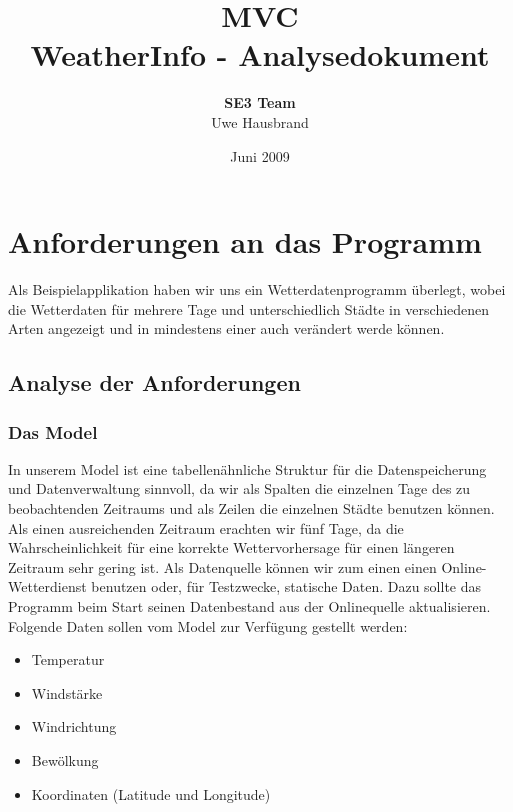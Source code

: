 \documentclass[11pt,a4paper]{scrreprt}
\begin{document}
\selectlanguage{\german}
\title{{\Huge \bf MVC}\\[0.55em]{\LARGE WeatherInfo - Analysedokument}}
\author{{\bf SE3 Team}\\Uwe Hausbrand}
\date{Juni 2009}

\maketitle

\tableofcontents

\chapter{Anforderungen an das Programm}

Als Beispielapplikation haben wir uns ein Wetterdatenprogramm \"uberlegt, wobei die
Wetterdaten f\"ur mehrere Tage und unterschiedlich St\"adte in verschiedenen Arten
angezeigt und in mindestens einer auch ver\"andert werde k\"onnen.

\section{Analyse der Anforderungen}

\subsection{Das Model}
In unserem Model ist eine tabellen\"ahnliche Struktur f\"ur die Datenspeicherung und
Datenverwaltung sinnvoll, da wir als Spalten die einzelnen Tage des zu beobachtenden
Zeitraums und als Zeilen die einzelnen St\"adte benutzen k\"onnen. Als einen ausreichenden
Zeitraum erachten wir f\"unf Tage, da die Wahrscheinlichkeit f\"ur eine
korrekte Wettervorhersage f\"ur einen l\"angeren Zeitraum sehr gering ist.
Als Datenquelle k\"onnen wir zum einen einen Online-Wetterdienst benutzen oder, f\"ur Testzwecke,
statische Daten. Dazu sollte das Programm beim Start seinen Datenbestand aus der Onlinequelle
aktualisieren.\\[11pt]
Folgende Daten sollen vom Model zur Verf\"ugung gestellt werden:
\begin{itemize}
  \item Temperatur
  \item Windst\"arke
  \item Windrichtung
  \item Bew\"olkung
  \item Koordinaten (Latitude und Longitude)
\end{itemize}
\end{document}

